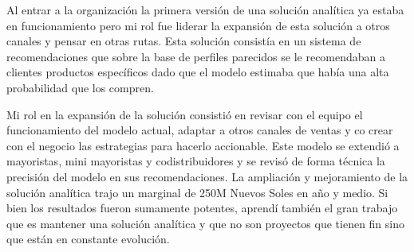 \documentclass{article}
\begin{document}
Al entrar a la organización la primera versión de una solución analítica ya estaba en funcionamiento pero mi rol fue liderar la expansión de esta solución a otros canales y pensar en otras rutas. Esta solución consistía en un sistema de recomendaciones que sobre la base de perfiles parecidos se le recomendaban a clientes productos específicos dado que el modelo estimaba que había una alta probabilidad que los compren.

Mi rol en la expansión de la solución consistió en revisar con el equipo el funcionamiento del modelo actual, adaptar a otros canales de ventas y co crear con el negocio las estrategias para hacerlo accionable. Este modelo se extendió a mayoristas, mini mayoristas y codistribuidores y se revisó de forma técnica la precisión del modelo en sus recomendaciones. La ampliación y mejoramiento de la solución analítica trajo un marginal de 250M Nuevos Soles en año y medio. Si bien los resultados fueron sumamente potentes, aprendí también el gran trabajo que es mantener una solución analítica y que no son proyectos que tienen fin sino que están en constante evolución. 
\end{document}
